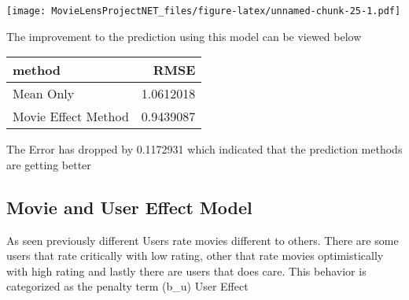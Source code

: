 \documentclass[
]{article}
\newenvironment{Shaded}{\begin{snugshade}}{\end{snugshade}}
\newcommand{\DataTypeTok}[1]{\textcolor[rgb]{0.13,0.29,0.53}{#1}}
\newcommand{\KeywordTok}[1]{\textcolor[rgb]{0.13,0.29,0.53}{\textbf{#1}}}
\newcommand{\NormalTok}[1]{#1}
\newcommand{\OperatorTok}[1]{\textcolor[rgb]{0.81,0.36,0.00}{\textbf{#1}}}
\newcommand{\StringTok}[1]{\textcolor[rgb]{0.31,0.60,0.02}{#1}}
\begin{document}
\texttt{[image: MovieLensProjectNET\_files/figure-latex/unnamed-chunk-25-1.pdf]}

The improvement to the prediction using this model can be viewed below

\begin{Shaded}
\end{Shaded}

\begin{longtable}[]{@{}lr@{}}
\toprule
method & RMSE\tabularnewline
\midrule
\endhead
Mean Only & 1.0612018\tabularnewline
Movie Effect Method & 0.9439087\tabularnewline
\bottomrule
\end{longtable}

The Error has dropped by 0.1172931 which indicated that the prediction
methods are getting better

\hypertarget{movie-and-user-effect-model}{%
\subsection{Movie and User Effect
Model}\label{movie-and-user-effect-model}}

As seen previously different Users rate movies different to others.
There are some users that rate critically with low rating, other that
rate movies optimistically with high rating and lastly there are users
that does care. This behavior is categorized as the penalty term (b\_u)
User Effect
\end{document}
